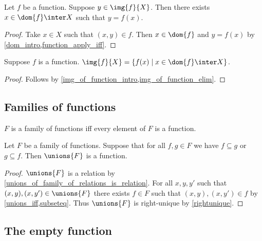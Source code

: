 \begin{proposition}\label{img_of_function_elim}
    Let $f$ be a function.
    Suppose $y\in \img{f}{X}$.
    Then there exists $x\in\dom{f}\inter X$ such that $y = f(x)$.
\end{proposition}
\begin{proof}
    Take $x\in X$ such that $(x,y)\in f$.
    Then $x\in\dom{f}$ and $y = f(x)$ by \cref{dom_intro,function_apply_iff}.
\end{proof}

\begin{proposition}\label{img_of_function}
    Suppose $f$ is a function.
    $\img{f}{X} = \{ f(x) \mid x\in\dom{f}\inter X\}$.
\end{proposition}
\begin{proof}
    Follows by \cref{img_of_function_intro,img_of_function_elim}.
\end{proof}

\subsection{Families of functions}

\begin{abbreviation}\label{family_of_functions}
    $F$ is a family of functions iff
    every element of $F$ is a function.
\end{abbreviation}

\begin{proposition}\label{unions_of_compatible_family_of_function_is_function}
    Let $F$ be a family of functions.
    Suppose that for all $f,g \in F$ we have $f\subseteq g$ or $g\subseteq f$.
    Then $\unions{F}$ is a function.
\end{proposition}
\begin{proof}
    $\unions{F}$ is a relation by \cref{unions_of_family_of_relations_is_relation}.
    For all $x,y, y'$ such that $(x,y),(x,y')\in \unions{F}$
        there exists $f\in F$ such that $(x,y),(x,y')\in f$
        by \cref{unions_iff,subseteq}.
    Thus $\unions{F}$ is right-unique by \cref{rightunique}.
\end{proof}


\subsection{The empty function}

